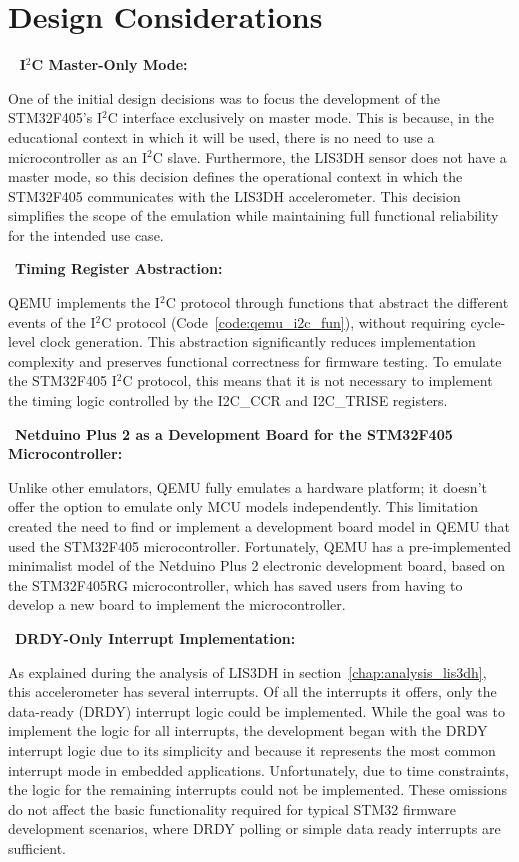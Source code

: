\section{Design Considerations}
\label{chap:design_decisions}

\textbullet\ \textbf{ I$^2$C Master-Only Mode:}

One of the initial design decisions was to focus the development of the 
\\STM32F405's  I$^2$C interface exclusively on master mode. This is because, in the 
educational context in which it will be used, there is no need to use a microcontroller 
as an  I$^2$C slave. Furthermore, the LIS3DH sensor does not have a master mode, so 
this decision defines the operational context in which the STM32F405 communicates 
with the LIS3DH accelerometer. This decision simplifies the scope of the emulation 
while maintaining full functional reliability for the intended use case.

\textbullet\ \textbf{Timing Register Abstraction:}

QEMU implements the  I$^2$C protocol through functions that abstract the different 
events of the  I$^2$C protocol (Code~\ref{code:qemu_i2c_fun}), without requiring cycle-level clock generation. This 
abstraction significantly reduces implementation complexity and preserves functional correctness for firmware testing. 
To emulate the STM32F405 I$^2$C protocol, this means that it is not necessary 
to implement the timing logic controlled by the I2C\_CCR and I2C\_TRISE registers.




\textbullet\ \textbf{Netduino Plus 2 as a Development Board for the STM32F405 Microcontroller:}

Unlike other emulators, QEMU fully emulates a hardware platform; it doesn't 
offer the option to emulate only MCU models independently. This limitation 
created the need to find or implement a development board model in QEMU that 
used the STM32F405 microcontroller. Fortunately, QEMU has a pre-implemented 
minimalist model of the Netduino Plus 2 electronic development board, based on 
the STM32F405RG microcontroller, which has saved users from having to develop 
a new board to implement the microcontroller.

\textbullet\ \textbf{DRDY-Only Interrupt Implementation:}

As explained during the analysis of LIS3DH in section~\ref{chap:analysis_lis3dh}, this accelerometer 
has several interrupts. Of all the interrupts it offers, only the data-ready (DRDY) 
interrupt logic could be implemented. While the goal was to implement the logic 
for all interrupts, the development began with the DRDY interrupt logic due to its 
simplicity and because it represents the most common interrupt mode in embedded 
applications. Unfortunately, due to time constraints, the logic for the remaining 
interrupts could not be implemented. These omissions do not affect the basic 
functionality required for typical STM32 firmware development scenarios, where DRDY 
polling or simple data ready interrupts are sufficient.

